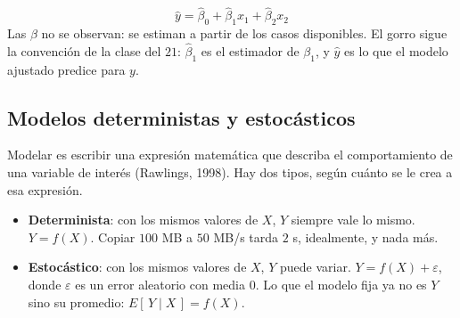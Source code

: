 \documentclass[11pt,letterpaper]{article}
\begin{document}
\[
    \hat{y} = \hat{\beta}_0 + \hat{\beta}_1 x_1 + \hat{\beta}_2 x_2
\]
Las $\beta$ no se observan: se estiman a partir de los casos
disponibles. El gorro sigue la convención de la clase del $21$:
$\hat{\beta}_1$ es el estimador de $\beta_1$, y $\hat{y}$ es lo que el
modelo ajustado predice para $y$.


\subsection*{Modelos deterministas y estocásticos}

Modelar es escribir una expresión matemática que describa el
comportamiento de una variable de interés (Rawlings, 1998). Hay dos
tipos, según cuánto se le crea a esa expresión.

\begin{itemize}[itemsep=0.3em]
    \item \textbf{Determinista}: con los mismos valores de $X$, $Y$
          siempre vale lo mismo. $Y = f(X)$. Copiar $100$ MB a
          $50$ MB/s tarda $2$ s, idealmente, y nada más.
    \item \textbf{Estocástico}: con los mismos valores de $X$, $Y$
          puede variar. $Y = f(X) + \varepsilon$, donde $\varepsilon$
          es un error aleatorio con media $0$. Lo que el modelo fija ya
          no es $Y$ sino su promedio: $E[\,Y \mid X\,] = f(X)$.
\end{itemize}
\end{document}
